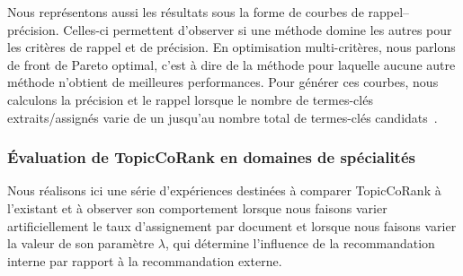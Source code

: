         Nous représentons aussi les résultats sous la forme de courbes de
        rappel--précision. Celles-ci permettent d'observer si une méthode domine
        les autres pour les critères de rappel et de précision. En optimisation
        multi-critères, nous parlons de front de Pareto optimal, c'est à dire de
        la méthode pour laquelle aucune autre méthode n'obtient de meilleures
        performances. Pour générer ces courbes, nous calculons la précision et
        le rappel lorsque  le nombre de termes-clés extraits/assignés varie de
        un jusqu'au nombre total de termes-clés
        candidats~\cite{hassan2010conundrums}.
      
      \subsubsection{Évaluation de TopicCoRank en domaines de spécialités}
      \label{subsubsec:main-domain_specific_keyphrase_annotation-supervised_automatic_keyphrase_annotation-evaluation-topiccorank_specific_domains}
        Nous réalisons ici une série d'expériences destinées à comparer
        TopicCoRank à l'existant et à observer son comportement lorsque nous
        faisons varier artificiellement le taux d'assignement par document et
        lorsque nous faisons varier la valeur de son paramètre $\lambda$, qui
        détermine l'influence de la recommandation interne par rapport à la
        recommandation externe.

